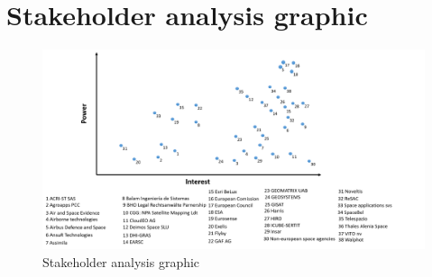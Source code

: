 \section{Stakeholder analysis graphic}
\begin{figure}[H]
	\centering
	\includegraphics[width=1.1\textwidth]{././images/identitymatrix.png} 
	\caption{Stakeholder analysis graphic}
\end{figure}

\clearpage